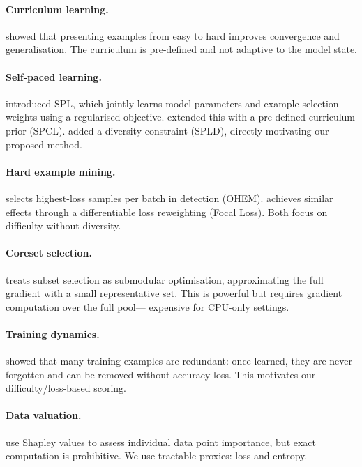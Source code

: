 \documentclass[10pt,twocolumn]{article}
\begin{document}
\paragraph{Curriculum learning.}
\citet{bengio2009curriculum} showed that presenting examples from easy to
hard improves convergence and generalisation. The curriculum is pre-defined
and not adaptive to the model state.

\paragraph{Self-paced learning.}
\citet{kumar2010selfpaced} introduced SPL, which jointly learns model
parameters and example selection weights using a regularised objective.
\citet{jiang2015self} extended this with a pre-defined curriculum prior
(SPCL). \citet{jiang2014spld} added a diversity constraint (SPLD),
directly motivating our proposed method.

\paragraph{Hard example mining.}
\citet{shrivastava2016ohem} selects highest-loss samples per batch in
detection (OHEM). \citet{lin2017focal} achieves similar effects through
a differentiable loss reweighting (Focal Loss). Both focus on difficulty
without diversity.

\paragraph{Coreset selection.}
\citet{mirzasoleiman2020craig} treats subset selection as submodular
optimisation, approximating the full gradient with a small representative
set. This is powerful but requires gradient computation over the full pool---
expensive for CPU-only settings.

\paragraph{Training dynamics.}
\citet{toneva2019forgetting} showed that many training examples are
redundant: once learned, they are never forgotten and can be removed
without accuracy loss. This motivates our difficulty/loss-based scoring.

\paragraph{Data valuation.}
\citet{ghorbani2019shapley} use Shapley values to assess individual data
point importance, but exact computation is prohibitive. We use tractable
proxies: loss and entropy.
\end{document}
